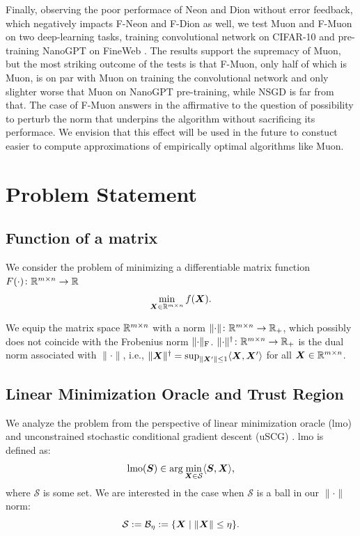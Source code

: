 \documentclass{article} %
\newcommand{\norm}[1]{\lVert #1\rVert}
\newcommand{\Rmn}{\R^{m\times n}}
\newcommand{\cB}{\mathcal{B}}
\newcommand{\cS}{\mathcal{S}}
\DeclarePairedDelimiter{\normf}{\|}{\|_\mathrm{F}}
\def\<#1,#2>{\langle #1,#2\rangle}
\begin{document}
 Finally, observing the poor performace of Neon and Dion without error feedback, which negatively impacts F-Neon and F-Dion as well, we test Muon and F-Muon on two deep-learning tasks, training convolutional network on CIFAR-10 \citep{cifar2023airbench} and pre-training NanoGPT on FineWeb \citep{modded_nanogpt_2024}. The results support the supremacy of Muon, but the most striking outcome of the tests is that F-Muon, only half of which is Muon, is on par with Muon on training the convolutional network and only slighter worse that Muon on NanoGPT pre-training, while NSGD is far from that. The case of F-Muon answers in the affirmative to the question of possibility to perturb the norm that underpins the algorithm without sacrificing its performace. We envision that this effect will be used in the future to constuct easier to compute approximations of empirically optimal algorithms like Muon.


\section{Problem Statement}
\subsection{Function of a matrix}
    We consider the problem of minimizing a differentiable matrix function $F(\cdot)\colon \Rmn \to \R$
    \begin{equation}\label{eq:mat}
        \min_{\mX \in \Rmn} f(\mX).
    \end{equation}

    We equip the matrix space $\Rmn$ with a norm $\norm{\cdot}\colon \Rmn \to \R_+$, which possibly does not coincide with the Frobenius norm $\normf{\cdot}$. $\norm{\cdot}^\dagger\colon \Rmn \to \R_+$ is the dual norm associated with $\norm{\cdot}$, i.e., $\norm{\mX}^\dagger = \sup_{\norm{\mX'}\leq 1} \<\mX,\mX'>$ for all $\mX \in \Rmn$.
 
\subsection{Linear Minimization Oracle and Trust Region}
    We analyze the problem from the perspective of linear minimization oracle (lmo) and unconstrained stochastic conditional gradient descent (uSCG) \citep{pethick2025training}. lmo is defined as:
    \begin{equation}\label{eq:lmo}
        \mathrm{lmo}(\mS) \in \arg\min_{\mX \in \cS} \<\mS, \mX>,
    \end{equation}
    where $\cS$ is some set. We are interested in the case when $\cS$ is a ball in our $\norm{\cdot}$ norm:
    \begin{equation}\label{eq:ball}
        \cS := \cB_\eta :=\{ \mX \mid \norm{\mX} \leq \eta \}.
    \end{equation}
\end{document}
